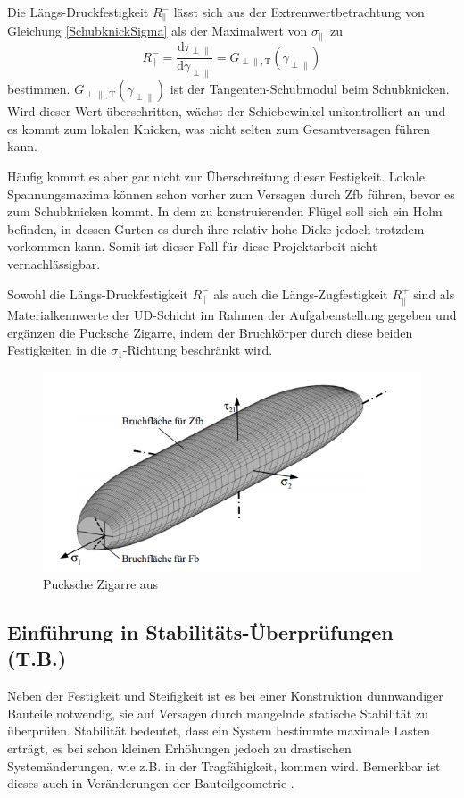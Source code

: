 Die Längs-Druckfestigkeit $R_\parallel^-$ lässt sich aus der Extremwertbetrachtung von Gleichung \ref{SchubknickSigma} als der Maximalwert von $\sigma_{\parallel}^-$ zu
\begin{equation}
	R_\parallel^- = \frac{\mathrm{d}\tau_{\perp\parallel}}{\mathrm{d}\gamma_{\perp\parallel}} = G_{\perp\parallel,\mathrm{T}}(\gamma_{\perp\parallel})
\end{equation}
bestimmen. $G_{\perp\parallel,\mathrm{T}}(\gamma_{\perp\parallel})$ ist der Tangenten-Schubmodul beim Schubknicken. Wird dieser Wert überschritten, wächst der Schiebewinkel unkontrolliert an und es kommt zum lokalen Knicken, was nicht selten zum Gesamtversagen führen kann.

\noindent Häufig kommt es aber gar nicht zur Überschreitung dieser Festigkeit. Lokale Spannungsmaxima können schon vorher zum Versagen durch Zfb führen, bevor es zum Schubknicken kommt. In dem zu konstruierenden Flügel soll sich ein Holm befinden, in dessen Gurten es durch ihre relativ hohe Dicke jedoch trotzdem vorkommen kann. Somit ist dieser Fall für diese Projektarbeit nicht vernachlässigbar.

\noindent Sowohl die Längs-Druckfestigkeit $R_\parallel^-$ als auch die Längs-Zugfestigkeit $R_\parallel^+$ sind als Materialkennwerte der UD-Schicht im Rahmen der Aufgabenstellung gegeben und ergänzen die Pucksche Zigarre, indem der Bruchkörper durch diese beiden Festigkeiten in die $\sigma_1$-Richtung beschränkt wird.
\begin{figure}[h]
	\includegraphics[width=1.0\textwidth]{Bilder/Zigarre.png}
	\caption{Pucksche Zigarre aus \cite{item3}}
\end{figure} 
\newpage
\FloatBarrier
\:
\newpage
\subsection{Einführung in Stabilitäts-Überprüfungen (T.B.)}\label{Beulen}
Neben der Festigkeit und Steifigkeit ist es bei einer Konstruktion dünnwandiger Bauteile notwendig, sie auf Versagen durch mangelnde statische Stabilität zu überprüfen. Stabilität bedeutet, dass ein System bestimmte maximale Lasten erträgt, es bei schon kleinen Erhöhungen jedoch zu drastischen Systemänderungen, wie z.B. in der Tragfähigkeit, kommen wird. Bemerkbar ist dieses auch in Veränderungen der Bauteilgeometrie \cite{item16}.\\

